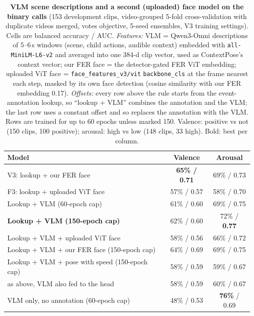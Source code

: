 \documentclass[11pt]{article}
\newcommand{\code}[1]{\texttt{#1}}
\newcommand{\best}[1]{\textbf{#1}}
\begin{document}
\begin{table}[!htbp]
\centering
\caption{\textbf{VLM scene descriptions and a second (uploaded) face model on the binary calls} (153 development clips, video-grouped 5-fold cross-validation with duplicate videos merged, votes objective, 5-seed ensembles, V3 training settings). Cells are balanced accuracy / AUC.
\emph{Features:} VLM = Qwen3-Omni descriptions of 5--6\,s windows (scene, child actions, audible context) embedded with \code{all-MiniLM-L6-v2} and averaged into one 384-d clip vector, used as ContextPose's context vector; our FER face = the detector-gated FER ViT embedding; uploaded ViT face = \code{face\_features\_v3/vit} \code{backbone\_cls} at the frame nearest each step, masked by its own face detection (cosine similarity with our FER embedding 0.17).
\emph{Offsets:} every row above the rule starts from the event-annotation lookup, so ``lookup + VLM'' combines the annotation and the VLM; the last row uses a constant offset and so replaces the annotation with the VLM. Rows are trained for up to 60 epochs unless marked 150. Valence: positive vs not (150 clips, 100 positive); arousal: high vs low (148 clips, 33 high). Bold: best per column.}
\label{tab:vlm}
\begin{tabular}{lcc}
\toprule
Model & Valence & Arousal \\
\midrule
V3: lookup + our FER face & \best{65\% / 0.71} & 69\% / 0.73 \\
F3: lookup + uploaded ViT face & 57\% / 0.57 & 58\% / 0.70 \\
Lookup + VLM (60-epoch cap) & 61\% / 0.60 & 69\% / 0.75 \\
\best{Lookup + VLM (150-epoch cap)} & 62\% / 0.60 & 72\% / \best{0.77} \\
Lookup + VLM + uploaded ViT face & 58\% / 0.56 & 66\% / 0.72 \\
Lookup + VLM + our FER face (150-epoch cap) & 64\% / 0.69 & 69\% / 0.75 \\
Lookup + VLM + pose with speed (150-epoch cap) & 58\% / 0.59 & 59\% / 0.67 \\
\quad as above, VLM also fed to the head & 58\% / 0.59 & 60\% / 0.67 \\
\midrule
VLM only, no annotation (60-epoch cap) & 48\% / 0.53 & \best{76\%} / 0.69 \\
\bottomrule
\end{tabular}
\end{table}
\end{document}
